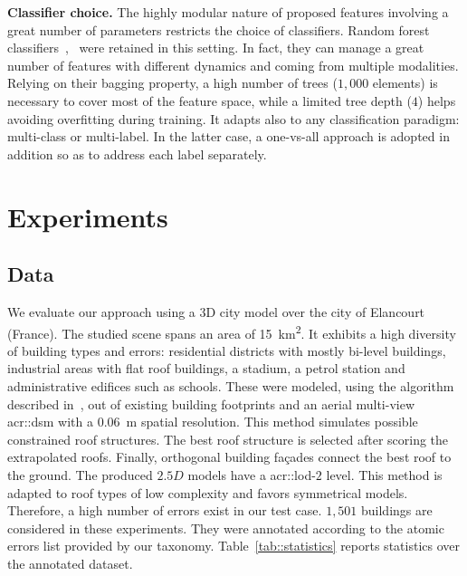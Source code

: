 \documentclass[runningheads]{llncs}
\begin{document}
\noindent
\textbf{Classifier choice.} The highly modular nature of proposed features involving a great number of parameters restricts the choice of classifiers. Random forest classifiers~\cite{breiman2001random},~\cite{criminisi2013decision} were retained in this setting. In fact, they can manage a great number of features with different dynamics and coming from multiple modalities. Relying on their bagging property, a high number of trees ($1,000$ elements) is necessary to cover most of the feature space, while a limited tree depth ($4$) helps avoiding overfitting during training. It adapts also to any classification paradigm: multi-class or multi-label. In the latter case, a one-vs-all approach is adopted in addition so as to address each label separately.
\section{Experiments}
\label{sec:expe}
\subsection{Data}

We evaluate our approach using a 3D city model over the city of Elancourt (France). The studied scene spans an area of \SI{15}{\km\squared}. It exhibits a high diversity of building types and errors: residential districts with mostly bi-level buildings, industrial areas with flat roof buildings, a stadium, a petrol station and administrative edifices such as schools. These were modeled, using the algorithm described in~\cite{Durupt2006}, out of existing building footprints and an aerial multi-view \acrshort{acr::dsm} with a \SI{0.06}{\m} spatial resolution. This method simulates possible constrained roof structures. The best roof structure is selected after scoring the extrapolated roofs. Finally, orthogonal building fa\c{c}ades connect the best roof to the ground. The produced $2.5D$ models have a \acrshort{acr::lod}-$2$ level. This method is adapted to roof types of low complexity and favors symmetrical models. Therefore, a high number of errors exist in our test case.  $1,501$ buildings are considered in these experiments. They were annotated according to the atomic errors list provided by our taxonomy. Table~\ref{tab::statistics} reports statistics over the annotated dataset.
\end{document}
